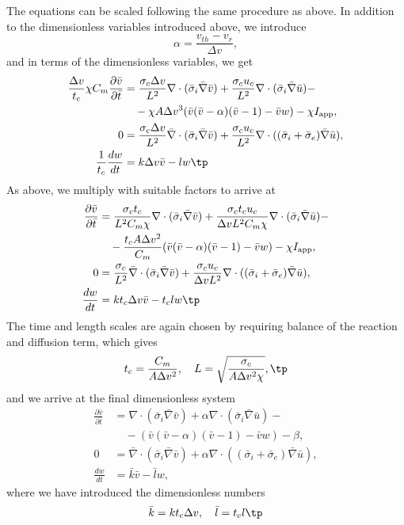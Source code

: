\documentclass[graybox,envcountchap,sectrefs,final]{svmonodo}
\begin{document}
The equations can be scaled following the same procedure as above. In
addition to the dimensionless variables introduced above, we introduce
\[
\alpha = \frac{v_{th}-v_r}{\Delta v} ,
\]
and in terms of the dimensionless variables, we get
\begin{align*}
\frac{\Delta v}{t_c}\chi C_m\frac{\partial \bar v}{\partial \bar t} &=
\frac{\sigma_c\Delta v }{L^2}\nabla\cdot( \bar \sigma_i\bar\nabla\bar v) +
\frac{\sigma_c u_c}{L^2}\nabla\cdot (\bar \sigma_i\bar \nabla \bar u) -\\ 
&\quad - \chi A\Delta v^3 (\bar v (\bar  v-\alpha)(\bar v -1) -
\bar v w) -\chi I_{\rm{app}},
\\ 
0 &= \frac{\sigma_c\Delta v }{L^2}\bar \nabla\cdot( \bar \sigma_i\bar
\nabla \bar v)
+ \frac{\sigma_cu_c}{L^2}\nabla\cdot ((\bar \sigma_i + \bar \sigma_e)\bar \nabla \bar u),\\ 
\frac{1}{t_c} \frac{dw}{dt} &= k \Delta v \bar v
-l w \tp
\end{align*}
As above, we multiply with suitable factors to arrive at
\begin{align*}
\frac{\partial \bar v}{\partial \bar t} &=
\frac{\sigma_c t_c}{L^2 C_m \chi}\nabla\cdot( \bar \sigma_i\bar\nabla\bar v) +
\frac{\sigma_c t_c u_c}{\Delta v L^2 C_m \chi}\nabla\cdot (\bar \sigma_i\bar \nabla \bar u) -\\ 
&\quad - \frac{t_c A\Delta v^2}{C_m} (\bar v (\bar v-\alpha)(\bar v -1) - \bar v
w) -\chi I_{\rm{app}}, \\ 
0 &= \frac{\sigma_c}{L^2}\bar \nabla\cdot( \bar \sigma_i\bar
\nabla \bar v)
+ \frac{\sigma_cu_c}{\Delta v L^2}\nabla\cdot ((\bar \sigma_i + \bar \sigma_e)\bar \nabla \bar u),\\ 
\frac{dw}{dt}&= k {t_c}{\Delta v} \bar
v -t_c l w \tp
\end{align*}
The time and length scales are again chosen by requiring balance of
the reaction and diffusion term, which gives
\[ t_c = \frac{C_m}{A \Delta v^2},\quad L = \sqrt{\frac{\sigma_c}{A
\Delta v^2 \chi}},\tp\]
 and we arrive at the final dimensionless system
\begin{align*}
\frac{\partial \bar v}{\partial \bar t} &=
\nabla\cdot( \bar \sigma_i\bar\nabla\bar v) +
\alpha \nabla\cdot (\bar \sigma_i\bar \nabla \bar u) -\\ 
&\quad - (\bar v (\bar v-\alpha)(\bar v -1) - \bar v
w) -\beta, \\ 
0 &= \bar \nabla\cdot( \bar \sigma_i\bar
\nabla \bar v)
+ \alpha \nabla\cdot ((\bar \sigma_i + \bar \sigma_e)\bar \nabla \bar u),\\ 
\frac{dw}{dt}&= \bar k \bar
v -\bar l w ,
\end{align*}
where we have introduced the dimensionless numbers
\[
\bar k = k {t_c}{\Delta v} , \quad \bar l = t_c l \tp
\]
\end{document}
